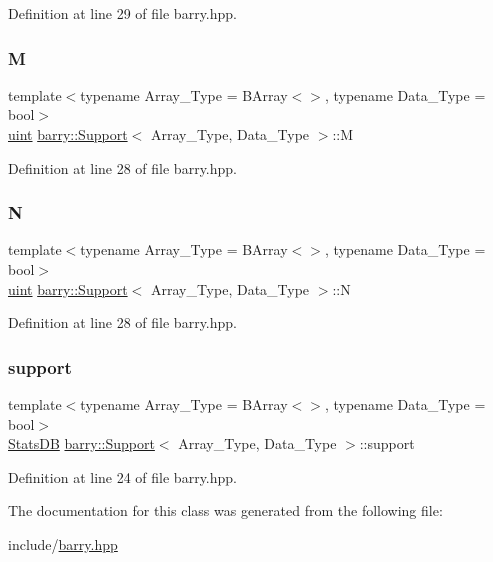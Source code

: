 Definition at line 29 of file barry.\+hpp.

\mbox{\label{classbarry_1_1_support_aaceb2f83d235c70034e089087991cff8}} 
\subsubsection{\texorpdfstring{M}{M}}
{\footnotesize\ttfamily template$<$typename Array\+\_\+\+Type  = B\+Array$<$$>$, typename Data\+\_\+\+Type  = bool$>$ \\
\hyperlink{namespacebarry_a11dfc53ddb4672278319aa04f1e09a6c}{uint} \hyperlink{classbarry_1_1_support}{barry\+::\+Support}$<$ Array\+\_\+\+Type, Data\+\_\+\+Type $>$\+::M}



Definition at line 28 of file barry.\+hpp.

\mbox{\label{classbarry_1_1_support_a1e3158ceae716505cb0c5fb14374be9b}} 
\subsubsection{\texorpdfstring{N}{N}}
{\footnotesize\ttfamily template$<$typename Array\+\_\+\+Type  = B\+Array$<$$>$, typename Data\+\_\+\+Type  = bool$>$ \\
\hyperlink{namespacebarry_a11dfc53ddb4672278319aa04f1e09a6c}{uint} \hyperlink{classbarry_1_1_support}{barry\+::\+Support}$<$ Array\+\_\+\+Type, Data\+\_\+\+Type $>$\+::N}



Definition at line 28 of file barry.\+hpp.

\mbox{\label{classbarry_1_1_support_ac9942324040dfed9e0f2347b4d9d25b3}} 
\subsubsection{\texorpdfstring{support}{support}}
{\footnotesize\ttfamily template$<$typename Array\+\_\+\+Type  = B\+Array$<$$>$, typename Data\+\_\+\+Type  = bool$>$ \\
\hyperlink{classbarry_1_1_stats_d_b}{Stats\+DB} \hyperlink{classbarry_1_1_support}{barry\+::\+Support}$<$ Array\+\_\+\+Type, Data\+\_\+\+Type $>$\+::support}



Definition at line 24 of file barry.\+hpp.



The documentation for this class was generated from the following file\+:\begin{DoxyCompactItemize}
\item 
include/\hyperlink{barry_8hpp}{barry.\+hpp}\end{DoxyCompactItemize}
